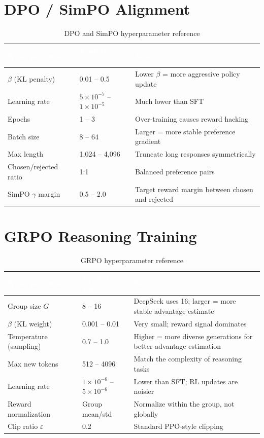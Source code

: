 \section{DPO / SimPO Alignment}

\begin{table}[H]
\centering\small\sffamily
{}
\begin{tabular}{L{3.5cm}L{3cm}L{5cm}}
\toprule
{}\textcolor{white}{\textbf{Hyperparameter}} & \textcolor{white}{\textbf{Typical Value}} & \textcolor{white}{\textbf{Notes}} \\
\midrule
$\beta$ (KL penalty) & 0.01 -- 0.5 & Lower $\beta$ = more aggressive policy update \\
Learning rate & $5\times10^{-7}$ -- $1\times10^{-5}$ & Much lower than SFT \\
Epochs & 1 -- 3 & Over-training causes reward hacking \\
Batch size & 8 -- 64 & Larger = more stable preference gradient \\
Max length & 1,024 -- 4,096 & Truncate long responses symmetrically \\
Chosen/rejected ratio & 1:1 & Balanced preference pairs \\
SimPO $\gamma$ margin & 0.5 -- 2.0 & Target reward margin between chosen and rejected \\
\bottomrule
\end{tabular}
\caption{DPO and SimPO hyperparameter reference}
\end{table}

\section{GRPO Reasoning Training}

\begin{table}[H]
\centering\small\sffamily
{}
\begin{tabular}{L{3.5cm}L{3cm}L{5cm}}
\toprule
{}\textcolor{white}{\textbf{Hyperparameter}} & \textcolor{white}{\textbf{Typical Value}} & \textcolor{white}{\textbf{Notes}} \\
\midrule
Group size $G$ & 8 -- 16 & DeepSeek uses 16; larger = more stable advantage estimate \\
$\beta$ (KL weight) & 0.001 -- 0.01 & Very small; reward signal dominates \\
Temperature (sampling) & 0.7 -- 1.0 & Higher = more diverse generations for better advantage estimation \\
Max new tokens & 512 -- 4096 & Match the complexity of reasoning tasks \\
Learning rate & $1\times10^{-6}$ -- $5\times10^{-6}$ & Lower than SFT; RL updates are noisier \\
Reward normalization & Group mean/std & Normalize within the group, not globally \\
Clip ratio $\varepsilon$ & 0.2 & Standard PPO-style clipping \\
\bottomrule
\end{tabular}
\caption{GRPO hyperparameter reference}
\end{table}

